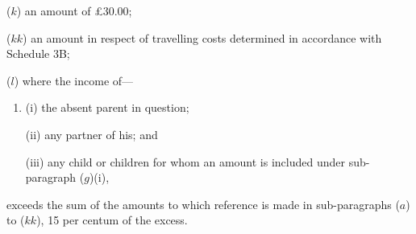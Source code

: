 \documentclass[a4paper]{article}
\begin{document}
\begin{enumerate}
($k$) an amount of 
£30.00; %

($kk$) an amount in respect of travelling costs determined in accordance with Schedule 3B;

($l$) where the income of—
\begin{enumerate}\item[]
(i) the absent parent in question;

(ii) any partner of his; and

(iii) any child or children for whom an amount is included under sub-paragraph ($g$)(i),
\end{enumerate}
exceeds the sum of the amounts to which reference is made in sub-paragraphs 
($a$) to ($kk$),  %
15 per centum %
of the excess.
\end{enumerate}
\end{document}
